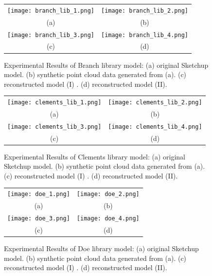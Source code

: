 \begin{figure} [htbp]
\begin{center}
\begin{tabular}{cc}
\texttt{[image: branch\_lib\_1.png]} &
\texttt{[image: branch\_lib\_2.png]} \\
(a) & (b) \\
\texttt{[image: branch\_lib\_3.png]} &
\texttt{[image: branch\_lib\_4.png]} \\
(c) & (d)
\end{tabular}
\end{center}
\caption{Experimental Results of Branch library model:
      (a) original Sketchup model.
      (b) synthetic point cloud data generated from (a).
      (c) reconstructed model (I) .
      (d) reconstructed model (II).}
\label{fig:ER_Fig4}
\end{figure}

\begin{figure} [htbp]
\begin{center}
\begin{tabular}{cc}
\texttt{[image: clements\_lib\_1.png]} &
\texttt{[image: clements\_lib\_2.png]} \\
(a) & (b) \\
\texttt{[image: clements\_lib\_3.png]} &
\texttt{[image: clements\_lib\_4.png]} \\
(c) & (d)
\end{tabular}
\end{center}
\caption{Experimental Results of Clements library model:
      (a) original Sketchup model.
      (b) synthetic point cloud data generated from (a).
      (c) reconstructed model (I) .
      (d) reconstructed model (II).}
\label{fig:ER_Fig5}
\end{figure}

\begin{figure} [htbp]
\begin{center}
\begin{tabular}{cc}
\texttt{[image: doe\_1.png]} &
\texttt{[image: doe\_2.png]} \\
(a) & (b) \\
\texttt{[image: doe\_3.png]} &
\texttt{[image: doe\_4.png]} \\
(c) & (d)
\end{tabular}
\end{center}
\caption{Experimental Results of Doe library model:
      (a) original Sketchup model.
      (b) synthetic point cloud data generated from (a).
      (c) reconstructed model (I) .
      (d) reconstructed model (II).}
\label{fig:ER_Fig6}
\end{figure}


